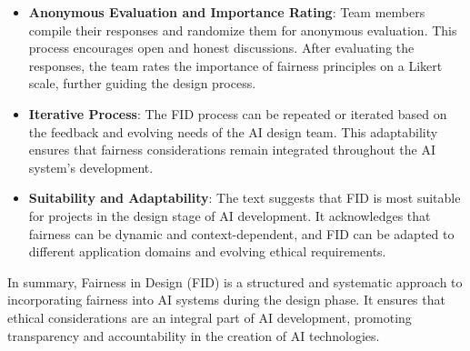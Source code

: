 \documentclass{article}
\begin{document}
\begin{itemize}
    \item \textbf{Anonymous Evaluation and Importance Rating}: Team members compile their responses and randomize them for anonymous evaluation. This process encourages open and honest discussions. After evaluating the responses, the team rates the importance of fairness principles on a Likert scale, further guiding the design process.
    
    \item \textbf{Iterative Process}: The FID process can be repeated or iterated based on the feedback and evolving needs of the AI design team. This adaptability ensures that fairness considerations remain integrated throughout the AI system's development.
    
    \item \textbf{Suitability and Adaptability}: The text suggests that FID is most suitable for projects in the design stage of AI development. It acknowledges that fairness can be dynamic and context-dependent, and FID can be adapted to different application domains and evolving ethical requirements.
\end{itemize}

In summary, Fairness in Design (FID) is a structured and systematic approach to incorporating fairness into AI systems during the design phase. It ensures that ethical considerations are an integral part of AI development, promoting transparency and accountability in the creation of AI technologies.
\end{document}
